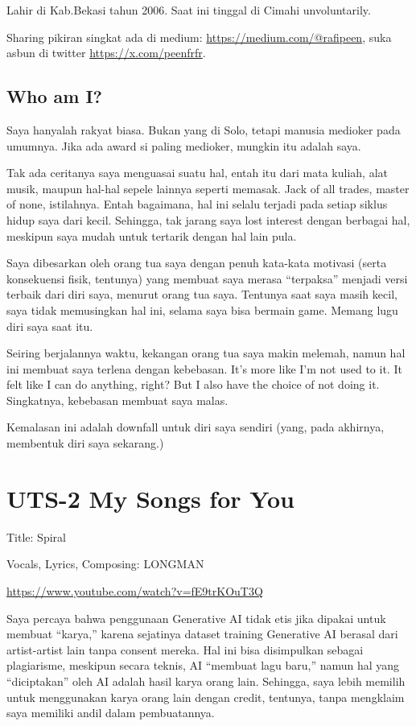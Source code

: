 \documentclass[
  letterpaper,
  DIV=11,
  numbers=noendperiod]{scrreprt}
\begin{document}
Lahir di Kab.Bekasi tahun 2006. Saat ini tinggal di Cimahi
unvoluntarily.

Sharing pikiran singkat ada di medium:
\url{https://medium.com/@rafipeen}, suka asbun di twitter
\url{https://x.com/peenfrfr}.

\section{\texorpdfstring{\textbf{Who am I?}}{Who am I?}}\label{who-am-i}

Saya hanyalah rakyat biasa. Bukan yang di Solo, tetapi manusia medioker
pada umumnya. Jika ada award si paling medioker, mungkin itu adalah
saya.

Tak ada ceritanya saya menguasai suatu hal, entah itu dari mata kuliah,
alat musik, maupun hal-hal sepele lainnya seperti memasak. Jack of all
trades, master of none, istilahnya. Entah bagaimana, hal ini selalu
terjadi pada setiap siklus hidup saya dari kecil. Sehingga, tak jarang
saya lost interest dengan berbagai hal, meskipun saya mudah untuk
tertarik dengan hal lain pula.

Saya dibesarkan oleh orang tua saya dengan penuh kata-kata motivasi
(serta konsekuensi fisik, tentunya) yang membuat saya merasa
``terpaksa'' menjadi versi terbaik dari diri saya, menurut orang tua
saya. Tentunya saat saya masih kecil, saya tidak memusingkan hal ini,
selama saya bisa bermain game. Memang lugu diri saya saat itu.

Seiring berjalannya waktu, kekangan orang tua saya makin melemah, namun
hal ini membuat saya terlena dengan kebebasan. It's more like I'm not
used to it. It felt like I can do anything, right? But I also have the
choice of not doing it. Singkatnya, kebebasan membuat saya malas.

Kemalasan ini adalah downfall untuk diri saya sendiri (yang, pada
akhirnya, membentuk diri saya sekarang.)


\chapter{UTS-2 My Songs for You}\label{uts-2-my-songs-for-you}

Title: Spiral

Vocals, Lyrics, Composing: LONGMAN

\url{https://www.youtube.com/watch?v=fE9trKOuT3Q}

Saya percaya bahwa penggunaan Generative AI tidak etis jika dipakai
untuk membuat ``karya,'' karena sejatinya dataset training Generative AI
berasal dari artist-artist lain tanpa consent mereka. Hal ini bisa
disimpulkan sebagai plagiarisme, meskipun secara teknis, AI ``membuat
lagu baru,'' namun hal yang ``diciptakan'' oleh AI adalah hasil karya
orang lain. Sehingga, saya lebih memilih untuk menggunakan karya orang
lain dengan credit, tentunya, tanpa mengklaim saya memiliki andil dalam
pembuatannya.
\end{document}
